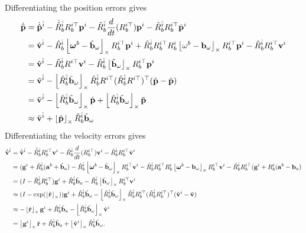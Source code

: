 Differentiating the position errors gives
\begin{align*}
    \dot{\tilde{\mathbf{p}}} &= \dot{\hat{\mathbf{p}}}^{\hat{i}}-\dot{\hat{R}}_b^{\hat{i}} R_b^{i\top}\mathbf{p}^i - \hat{R}_b^{\hat{i}}\frac{d}{dt}(R_b^{i\top}) \mathbf{p}^i - \hat{R}_b^{\hat{i}}R_b^{i\top} \dot{\mathbf{p}}^i \\
     &= \hat{\mathbf{v}}^{\hat{i}} - \hat{R}_b^{\hat{i}}\left\lfloor\boldsymbol{\omega}^b-\hat{\mathbf{b}}_\omega\right\rfloor_{\times} R_b^{i\top} \mathbf{p}^i + \hat{R}_b^{\hat{i}} R_b^{i\top} R_b^i\left\lfloor\omega^b-\mathbf{b}_\omega\right\rfloor_{\times} R_b^{i\top} \mathbf{p}^i - \hat{R}_b^{\hat{i}} R_b^{i\top} \mathbf{v}^i \\
     &= \hat{\mathbf{v}}^{\hat{i}} - \hat{R}_b^{\hat{i}}R^{i\top} \mathbf{v}^i   - \hat{R}_b^{\hat{i}}\left\lfloor\tilde{\mathbf{b}}_\omega\right\rfloor_{\times} R_b^{i\top} \mathbf{p}^i \\ 
    &= \tilde{\mathbf{v}}^{\hat{i}}  - \left\lfloor\hat{R}_b^{\hat{i}}\tilde{\mathbf{b}}_\omega\right\rfloor_{\times}\hat{R}_b^{\hat{i}}R^{i\top} (\hat{R}_b^{\hat{i}}R^{i\top})^\top(\hat{\mathbf{p}}-\tilde{\mathbf{p}}) \\
    &= \tilde{\mathbf{v}}^{\hat{i}}  - \left\lfloor\hat{R}_b^{\hat{i}}\tilde{\mathbf{b}}_\omega\right\rfloor_{\times}\hat{\mathbf{p}} + \left\lfloor\hat{R}_b^{\hat{i}}\tilde{\mathbf{b}}_\omega\right\rfloor_{\times}\tilde{\mathbf{p}} \\   
    &\approx \tilde{\mathbf{v}}^{\hat{i}}  + \left\lfloor\hat{\mathbf{p}}\right\rfloor_{\times} \hat{R}_b^{\hat{i}}\tilde{\mathbf{b}}_\omega \\     
\end{align*}
Differentiating the velocity errors gives
\begin{align*}
    \dot{\tilde{\mathbf{v}}}^{\hat{i}} &= \dot{\hat{\mathbf{v}}}^{\hat{i}}-\dot{\hat{R}}_b^{\hat{i}} R_b^{i\top} \mathbf{v}^i - \hat{R}_b^{\hat{i}} \frac{d}{dt}(R_b^{i\top}) \mathbf{v}^i -\hat{R}_b^{\hat{i}} R_b^{i\top} \dot{\mathbf{v}}^i \\
    &= (\mathbf{g}^i + \hat{R}_b^{\hat{i}} (\mathbf{a}^b+\hat{\mathbf{b}}_a)-\hat{R}_b^{\hat{i}} \left\lfloor\boldsymbol{\omega}^b-\hat{\mathbf{b}}_\omega\right\rfloor_{\times} R_b^{i\top} \mathbf{v}^i - \hat{R}_b^{\hat{i}} R_b^{i\top} R_b^i \left\lfloor\boldsymbol{\omega}^b-\mathbf{b}_\omega\right\rfloor_{\times} R_b^{i\top} \mathbf{v}^i -\hat{R}_b^{\hat{i}} R_b^{i\top}(\mathbf{g}^i + R_b^i (\mathbf{a}^b-\mathbf{b}_a) \\
    &= (I-\hat{R}_b^{\hat{i}}R_b^{i\top})\mathbf{g}^i + \hat{R}_b^{\hat{i}}\tilde{\mathbf{b}}_a - \hat{R}_b^{\hat{i}}\left\lfloor\tilde{\mathbf{b}}_\omega\right\rfloor_{\times} R_b^{i\top} \mathbf{v}^i  \\
    &\approx (I - \exp(\left\lfloor\tilde{\mathbf{r}}\right\rfloor_{\times}) ) \mathbf{g}^i + \hat{R}_b^{\hat{i}}\tilde{\mathbf{b}}_a - \left\lfloor\hat{R}_b^{\hat{i}}\tilde{\mathbf{b}}_\omega\right\rfloor_{\times} \hat{R}_b^{\hat{i}} R_b^{i\top} (\hat{R}_b^{\hat{i}} R_b^{i\top})^\top ( \hat{\mathbf{v}}^i - \tilde{\mathbf{v}})  \\
    &\approx -\left\lfloor\tilde{\mathbf{r}}\right\rfloor_{\times} \mathbf{g}^i + \hat{R}_b^{\hat{i}}\tilde{\mathbf{b}}_a - \left\lfloor\hat{R}_b^{\hat{i}}\tilde{\mathbf{b}}_\omega\right\rfloor_{\times}\hat{\mathbf{v}}^i  \\
    &= \left\lfloor\mathbf{g}^i\right\rfloor_{\times} \tilde{\mathbf{r}} + \hat{R}_b^{\hat{i}}\tilde{\mathbf{b}}_a + \left\lfloor\hat{\mathbf{v}}^i\right\rfloor_{\times} \hat{R}_b^{\hat{i}}\tilde{\mathbf{b}}_\omega.
\end{align*} 
